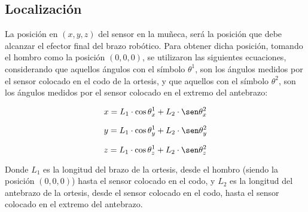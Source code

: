 \subsection{Localización}

La posición en $(x, y, z)$ del sensor en la muñeca, será la posición que debe alcanzar el efector final del brazo robótico. Para obtener dicha posición, tomando el hombro como la posición $(0, 0, 0)$, se utilizaron las siguientes ecuaciones, considerando que aquellos ángulos con el símbolo $\theta^1$, son los ángulos medidos por el sensor colocado en el codo de la ortesis, y que aquellos con el símbolo $\theta^2$, son los ángulos medidos por el sensor colocado en el extremo del antebrazo:

\begin{equation}
	x = L_1 \cdot \cos \theta^1_x +  L_2 \cdot \sen \theta^2_x
	\label{eq:angulox}
\end{equation}

\begin{equation}
	y = L_1 \cdot \cos \theta^1_y +  L_2 \cdot \sen \theta^2_y
	\label{eq:angulox}
\end{equation}

\begin{equation}
	z = L_1 \cdot \cos \theta^1_z +  L_2 \cdot \sen \theta^2_z
	\label{eq:angulox}
\end{equation}

Donde $L_1$ es la longitud del brazo de la ortesis, desde el hombro (siendo la posición $(0, 0, 0)$) hasta el sensor colocado en el codo, y $L_2$ es la longitud del antebrazo de la ortesis, desde el sensor colocado en el codo, hasta el sensor colocado en el extremo del antebrazo.